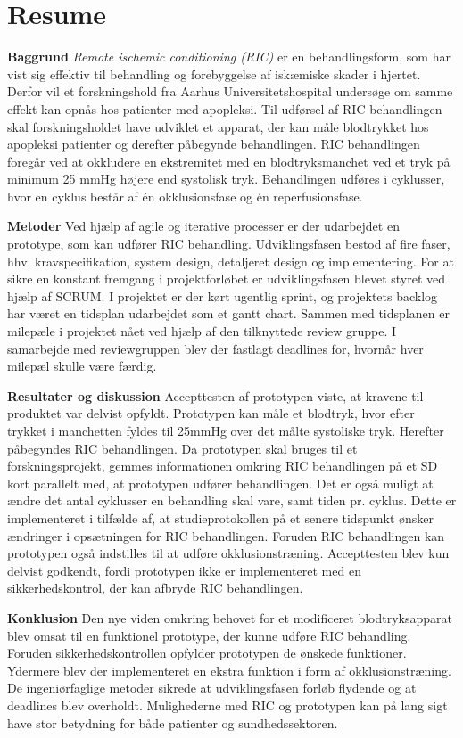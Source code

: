 \chapter*{Resume}
\textbf{Baggrund}
\textit{Remote ischemic conditioning (RIC)} er en behandlingsform, som har vist sig effektiv til behandling og forebyggelse af iskæmiske skader i hjertet. Derfor vil et forskningshold fra Aarhus Universitetshospital undersøge om samme effekt kan opnås hos patienter med apopleksi. Til udførsel af RIC behandlingen skal forskningsholdet have udviklet et apparat, der kan måle blodtrykket hos apopleksi patienter og derefter påbegynde behandlingen. RIC behandlingen foregår ved at okkludere en ekstremitet med en blodtryksmanchet ved et tryk på minimum 25 mmHg højere end systolisk tryk. Behandlingen udføres i cyklusser, hvor en cyklus består af én okklusionsfase og én reperfusionsfase. 

\textbf{Metoder}
Ved hjælp af agile og iterative processer er der udarbejdet en prototype, som kan udfører RIC behandling. Udviklingsfasen bestod af fire faser, hhv. kravspecifikation, system design, detaljeret design og implementering. For at sikre en konstant fremgang i projektforløbet er udviklingsfasen blevet styret ved hjælp af SCRUM. I projektet er der kørt ugentlig sprint, og projektets backlog har været en tidsplan udarbejdet som et gantt chart. Sammen med tidsplanen er milepæle i projektet nået ved hjælp af den tilknyttede review gruppe. I samarbejde med reviewgruppen blev der fastlagt deadlines for, hvornår hver milepæl skulle være færdig.

\textbf{Resultater og diskussion}
Accepttesten af prototypen viste, at kravene til produktet var delvist opfyldt. Prototypen kan måle et blodtryk, hvor efter trykket i manchetten fyldes til 25mmHg over det målte systoliske tryk. Herefter påbegyndes RIC behandlingen. Da prototypen skal bruges til et forskningsprojekt, gemmes informationen omkring RIC behandlingen på et SD kort parallelt med, at prototypen udfører behandlingen. Det er også muligt at ændre det antal cyklusser en behandling skal vare, samt tiden pr. cyklus. Dette er implementeret i tilfælde af, at studieprotokollen på et senere tidspunkt ønsker ændringer i opsætningen for RIC behandlingen. Foruden RIC behandlingen kan prototypen også indstilles til at udføre okklusionstræning. Accepttesten blev kun  delvist godkendt, fordi prototypen ikke er implementeret med en sikkerhedskontrol, der kan afbryde RIC behandlingen. 

\textbf{Konklusion}
 Den nye viden omkring behovet for et modificeret blodtryksapparat blev omsat til en funktionel prototype, der kunne udføre RIC behandling. Foruden sikkerhedskontrollen opfylder prototypen de ønskede funktioner. Ydermere blev der implementeret en ekstra funktion i form af okklusionstræning. De ingeniørfaglige metoder sikrede at udviklingsfasen forløb flydende og at deadlines blev overholdt. Mulighederne med RIC og prototypen kan på lang sigt have stor betydning for både patienter og sundhedssektoren.
